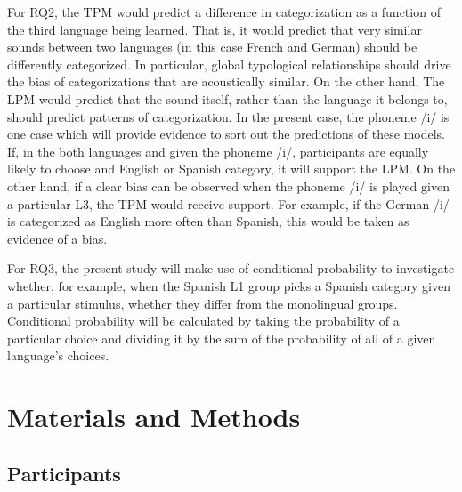 \documentclass[preprints]{Definitions/mdpi}
\begin{document}
For RQ2, the TPM would predict a difference in categorization as a function of the third language being learned.
That is, it would predict that very similar sounds between two languages (in this case French and German) should be differently categorized.
In particular, global typological relationships should drive the bias of categorizations that are acoustically similar.
On the other hand, The LPM would predict that the sound itself, rather than the language it belongs to, should predict patterns of categorization.
In the present case, the phoneme /i/ is one case which will provide evidence to sort out the predictions of these models.
If, in the both languages and given the phoneme /i/, participants are equally likely to choose and English or Spanish category, it will support the LPM.
On the other hand, if a clear bias can be observed when the phoneme /i/ is played given a particular L3, the TPM would receive support.
For example, if the German /i/ is categorized as English more often than Spanish, this would be taken as evidence of a bias.

For RQ3, the present study will make use of conditional probability to investigate whether, for example, when the Spanish L1 group picks a Spanish category given a particular stimulus, whether they differ from the monolingual groups.
Conditional probability will be calculated by taking the probability of a particular choice and dividing it by the sum of the probability of all of a given language's choices.

\section{Materials and Methods}

\hypertarget{participants}{%
\subsection{Participants}\label{participants}}
\end{document}
